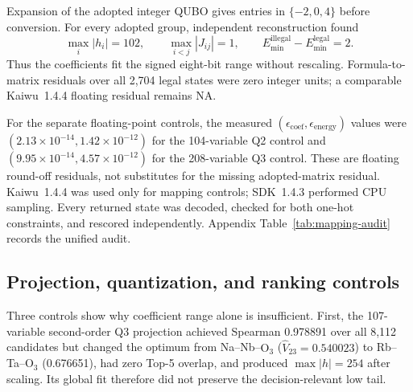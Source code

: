 Expansion of the adopted integer QUBO gives entries in $\{-2,0,4\}$
before conversion.  For every adopted group, independent reconstruction
found
\begin{equation}
 \max_i|h_i|=102,
 \qquad \max_{i<j}|J_{ij}|=1,
 \qquad E_{\min}^{\mathrm{illegal}}-E_{\min}^{\mathrm{legal}}=2.
 \label{eq:formal-precision-audit}
\end{equation}
Thus the coefficients fit the signed eight-bit range without rescaling.
Formula-to-matrix residuals over all 2,704 legal states were zero integer
units; a comparable Kaiwu~1.4.4 floating residual remains NA.

For the separate floating-point controls, the measured
$(\epsilon_{\mathrm{coef}},\epsilon_{\mathrm{energy}})$ values were
$(2.13\times10^{-14},1.42\times10^{-12})$ for the 104-variable Q2
control and $(9.95\times10^{-14},4.57\times10^{-12})$ for the
208-variable Q3 control.  These are floating round-off residuals, not
substitutes for the missing adopted-matrix residual.  Kaiwu~1.4.4 was used
only for mapping controls; SDK~1.4.3 performed CPU sampling.  Every returned
state was decoded, checked for both one-hot constraints, and rescored
independently.  Appendix Table~\ref{tab:mapping-audit} records the unified
audit.

\subsection{Projection, quantization, and ranking controls}

Three controls show why coefficient range alone is insufficient.  First, the
107-variable second-order Q3 projection achieved Spearman 0.978891 over all
8,112 candidates but changed the optimum from Na--Nb--$\mathrm{O}_3$
($\widehat V_{23}=0.540023$) to Rb--Ta--$\mathrm{O}_3$ (0.676651), had zero Top-5 overlap,
and produced $\max|h|=254$ after scaling.  Its global fit therefore did not
preserve the decision-relevant low tail.

